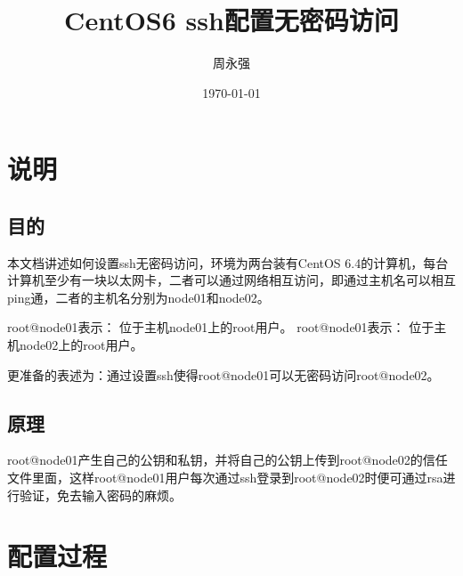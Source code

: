 \documentclass[a4paper]{article}
\title{CentOS6 ssh配置无密码访问} %
\author{周永强} %
\date{\today} %
\begin{document}
\maketitle %

\section{说明} %

\subsection{目的} %
本文档讲述如何设置ssh无密码访问，环境为两台装有CentOS 6.4的计算机，每台计算机至少有一块以太网卡，二者可以通过网络相互访问，即通过主机名可以相互ping通，二者的主机名分别为node01和node02。
\begin{pyglist}[language=bash]
   root@node01表示： 位于主机node01上的root用户。
   root@node01表示： 位于主机node02上的root用户。
\end{pyglist}
更准备的表述为：通过设置ssh使得root@node01可以无密码访问root@node02。

\subsection{原理} %
root@node01产生自己的公钥和私钥，并将自己的公钥上传到root@node02的信任文件里面，这样root@node01用户每次通过ssh登录到root@node02时便可通过rsa进行验证，免去输入密码的麻烦。

\section{配置过程} %
\end{document}
